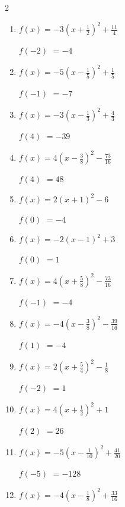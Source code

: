 \begin{multicols}{2}
\begin{enumerate}
  \item $\displaystyle f(x)=-3\left( x+\frac{1}{2}\right)^{2}+\frac{11}{4}$

$f(-2)$
        $=-4$

  \item $\displaystyle f(x)=-5\left( x-\frac{1}{5}\right)^{2}+\frac{1}{5}$

$f(-1)$
        $=-7$

  \item $\displaystyle f(x)=-3\left( x-\frac{1}{3}\right)^{2}+\frac{4}{3}$

$f(4)$
        $=-39$

\columnbreak %

  \item $\displaystyle f(x)=4\left( x-\frac{3}{8}\right)^{2}-\frac{73}{16}$

$f(4)$
        $=48$

  \item $\displaystyle f(x)=2\left( x+1\right)^{2}-6$

$f(0)$
        $=-4$

  \item $\displaystyle f(x)=-2\left( x-1\right)^{2}+3$

$f(0)$
        $=1$

  \item $\displaystyle f(x)=4\left( x+\frac{5}{8}\right)^{2}-\frac{73}{16}$

$f(-1)$
        $=-4$

  \item $\displaystyle f(x)=-4\left( x-\frac{3}{8}\right)^{2}-\frac{39}{16}$

$f(1)$
        $=-4$

\columnbreak %

\resetques

  \item $\displaystyle f(x)=2\left( x+\frac{5}{4}\right)^{2}-\frac{1}{8}$

$f(-2)$
        $=1$

  \item $\displaystyle f(x)=4\left( x+\frac{1}{2}\right)^{2}+1$

$f(2)$
        $=26$

  \item $\displaystyle f(x)=-5\left( x-\frac{1}{10}\right)^{2}+\frac{41}{20}$

$f(-5)$
        $=-128$

  \item $\displaystyle f(x)=-4\left( x-\frac{1}{8}\right)^{2}+\frac{33}{16}$


\end{enumerate}
\end{multicols}
